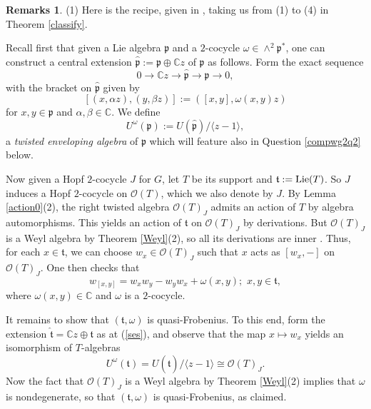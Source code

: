 \documentclass{amsart}
\numberwithin{equation}{section}
\theoremstyle{definition}
\newtheorem{remarks}[theorem]{Remarks}
\begin{document}
\begin{remarks}\label{equivrmk}
(1) Here is the recipe, given in \cite[Theorem 5.1]{G1}, taking us from (1) to (4) in Theorem \ref{classify}. 

Recall first that given a Lie algebra $\mathfrak{p}$ and a $2$-cocycle $\omega \in \wedge^2 \mathfrak{p}^{\ast}$, one can construct a central extension $\widehat{\mathfrak{p}} := \mathfrak{p} \oplus \mathbb{C}z$ of $\mathfrak{p}$ as follows. Form the exact sequence
\begin{equation}\label{ses} 0 \rightarrow \mathbb{C}z \rightarrow \widehat{\mathfrak{p}} \rightarrow \mathfrak{p} \rightarrow 0,
\end{equation}
with the bracket on $\widehat{\mathfrak{p}}$ given by
$$ [(x,\alpha z), (y,\beta z)]:=([x,y],\omega (x,y) z) $$
for $x,y \in \mathfrak{p}$ and $\alpha,\beta \in \mathbb{C}$. We define
\begin{equation}\label{omtwist} U^{\omega}(\mathfrak{p}) := U(\widehat{\mathfrak{p}})/\langle z - 1 \rangle,
\end{equation}
a \emph{twisted enveloping algebra} of $\mathfrak{p}$ which will feature also in Question \ref{compwg2q2} below.

Now given a Hopf $2$-cocycle $J$ for $G$, let $T$ be its support and $\mathfrak{t}:={\rm Lie}(T)$. So $J$ induces a Hopf $2$-cocycle on $\mathcal{O}(T)$, which we also denote by $J$. By Lemma \ref{action0}(2), the right twisted algebra $\mathcal{O}(T)_J$ admits an action of $T$ by algebra automorphisms. This yields an action of $\mathfrak{t}$ on $\mathcal{O}(T)_J$ by derivations. But $\mathcal{O}(T)_J$ is a Weyl algebra by Theorem \ref{Weyl}(2), so all its derivations are inner \cite[Lemma 4.6.8]{Dix}. Thus, for each $x \in \mathfrak{t}$, we can choose $w_x \in \mathcal{O}(T)_J$ such that $x$ acts as $[w_x,-]$ on $\mathcal{O}(T)_J$. One then checks that 
$$ w_{[x,y]} = w_x w_y - w_y w_x + \omega(x,y);\,\,x,y \in \mathfrak{t},$$
where $\omega(x,y) \in \mathbb{C}$ and $\omega$ is a $2$-cocycle. 

It remains to show that $(\mathfrak{t}, \omega)$ is quasi-Frobenius. To this end, form the extension $\widehat{\mathfrak{t}} = \mathbb{C}z \oplus \mathfrak{t}$ as at (\ref{ses}), and observe that the map $x \mapsto w_x$ yields an isomorphism  of $T$-algebras
\begin{equation}\label{done} U^{\omega}(\mathfrak{t})= U(\widehat{\mathfrak{t}})/\langle z-1 \rangle \cong \mathcal{O}(T)_J.
\end{equation}
Now the fact that $\mathcal{O}(T)_J$ is a Weyl algebra by Theorem \ref{Weyl}(2) implies that $\omega$ is nondegenerate, so that $(\mathfrak{t}, \omega)$ is quasi-Frobenius, as claimed.


\end{remarks}
\end{document}
